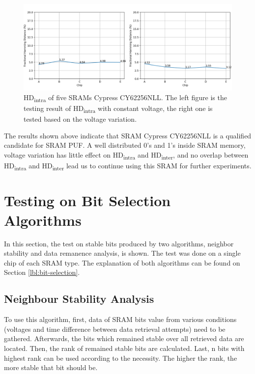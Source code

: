 \begin{figure}[tph!]
    \centerline{\includegraphics[width={\textwidth}]{images/cy62256nll_hd_intra}}
    \caption{HD\textsubscript{intra} of five SRAMs Cypress CY62256NLL. The left figure is the testing result of HD\textsubscript{intra} with constant voltage, the right one is tested based on the voltage variation.}
    \label{fig:cy62256nll_hd_intra}
\end{figure}

The results shown above indicate that SRAM Cypress CY62256NLL is a qualified candidate for SRAM PUF. A well distributed 0's and 1's inside SRAM memory, voltage variation has little effect on HD\textsubscript{intra} and HD\textsubscript{inter}, and no overlap between HD\textsubscript{intra} and HD\textsubscript{inter} lead us to continue using this SRAM for further experiments.

\section{Testing on Bit Selection Algorithms}

In this section, the test on stable bits produced by two algorithms, neighbor stability and data remanence analysis, is shown. The test was done on a single chip of each SRAM type.
The explanation of both algorithms can be found on Section \ref{lbl:bit-selection}.

\subsection{Neighbour Stability Analysis}
To use this algorithm, first, data of SRAM bits value from various conditions (voltages and time difference between data retrieval attempts) need to be gathered. Afterwards, the bits which remained stable over all retrieved data are located. Then, the rank of remained stable bits are calculated. Last, n bits with highest rank can be used according to the necessity. The higher the rank, the more stable that bit should be.

